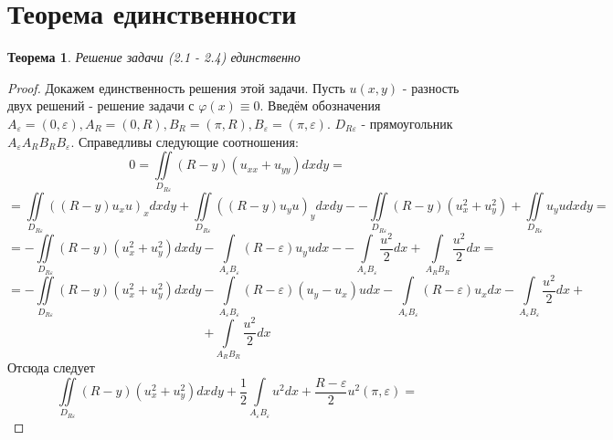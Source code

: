 \documentclass[a4paper, 12pt]{article}
\newtheorem{theorem}{Теорема}
\numberwithin{equation}{section}
\numberwithin{lemma}{section}
\numberwithin{definition}{section}
\numberwithin{notabene}{section}
\numberwithin{corollary}{section}
\begin{document}
\section{Теорема единственности}
\begin{theorem}
	Решение задачи (2.1 - 2.4) единственно
\end{theorem}
\begin{proof}
		Докажем единственность решения этой задачи. Пусть $u(x,y)$ - разность двух решений - решение задачи с $\varphi(x) \equiv 0$. \newline
	Введём обозначения $A_\varepsilon = (0, \varepsilon), A_R = (0, R), B_R = (\pi, R), B_\varepsilon = (\pi, \varepsilon)$. $D_{R\varepsilon}$ - прямоугольник $A_\varepsilon A_R B_R B_\varepsilon$. Справедливы следующие соотношения:
	\begin{equation*}
		0 = \iint\limits_{D_{R\varepsilon}} (R-y) (u_{xx} + u_{yy}) dx dy = 
	\end{equation*}
	\begin{equation*}
		=	\iint\limits_{D_{R\varepsilon}} \left( \left(R - y\right) u_x u\right)_x dx dy  + \iint\limits_{D_{R\varepsilon}} \left( \left(R - y\right) u_y u\right)_y dx dy  - 
		- \iint\limits_{D_{R\varepsilon}} \left(R- y\right) \left(u_x^2 + u_y^2\right) + \iint\limits_{D_{R\varepsilon}} u_y u dx dy = 
	\end{equation*}
	\begin{equation*}
		= - \iint\limits_{D_{R\varepsilon}} \left(R - y\right) \left(u_x^2 + u_y^2\right) dx dy
		- \int\limits_{A_\varepsilon B_\varepsilon} \left(R - \varepsilon\right) u_y u dx - 
		-\int\limits_{A_\varepsilon B_\varepsilon} \dfrac{u^2}{2} dx + \int\limits_{A_R B_R} \dfrac{u^2}{2} dx = 
	\end{equation*}
	\begin{equation*}
		= - \iint\limits_{D_{R\varepsilon}} \left(R - y\right) \left(u_x^2 + u_y^2\right) dx dy - 
		\int\limits_{A_\varepsilon B_\varepsilon} \left(R - \varepsilon \right) \left(u_y - u_x\right)u dx - \int\limits_{A_\varepsilon B_\varepsilon} \left(R - \varepsilon\right) u_x dx - \int\limits_{A_\varepsilon B_\varepsilon}\dfrac{u^2}{2} dx +
	\end{equation*}
	\begin{equation*}
		+ \int\limits_{A_R B_R} \dfrac{u^2}{2}dx
	\end{equation*}
	Отсюда следует
	\begin{equation*}
		\iint\limits_{D_{R\varepsilon}} \left(R - y\right) \left(u_x^2 + u_y^2\right) dx dy + \dfrac{1}{2}\int\limits_{A_\varepsilon B_\varepsilon} u^2 dx +\dfrac{R - \varepsilon}{2}u^2(\pi, \varepsilon)  =

\end{equation*}
\end{proof}
\end{document}
